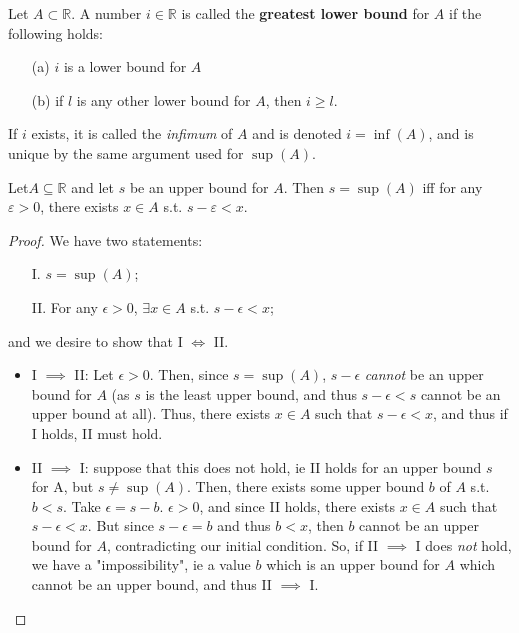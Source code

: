 \documentclass[12pt]{article}
\begin{document}
\begin{definition}
  Let $A \subset \mathbb{R}$. A number $i \in \mathbb{R}$ is called the \textbf{greatest lower bound} for $A$ if the following holds:
  \begin{itemize}
    \item[(a)] $i$ is a lower bound for $A$
    \item[(b)] if $l$ is any other lower bound for $A$, then $i \geq l$.
  \end{itemize}
  If $i$ exists, it is called the \emph{infimum} of $A$ and is denoted $i = \inf(A)$, and is unique by the same argument used for $\sup(A)$.
\end{definition}

\begin{proposition}\label{prop:supepsilon}
  Let\footnotemark $A \subseteq \mathbb{R}$ and let $s$ be an upper bound for $A$. Then $s = \sup(A)$ iff for any $\varepsilon>0$, there exists $x \in A$ s.t. $s- \varepsilon < x$.
\end{proposition}
\begin{proof}
  We have two statements:
  \begin{enumerate}
    \item[I.] $s = \sup(A)$;
    \item[II.] For any $\epsilon > 0$, $\exists x \in A$  s.t. $s - \epsilon < x$;
  \end{enumerate}
  and we desire to show that I $\iff$ II.
  \begin{itemize}
    \item I $\implies$ II: Let $\epsilon > 0$. Then, since $s = \sup(A)$, $s - \epsilon$ \textit{cannot} be an upper bound for $A$ (as $s$ is the least upper bound, and thus $s - \epsilon < s$ cannot be an upper bound at all). Thus, there exists $x \in A$ such that $s - \epsilon < x$, and thus if I holds, II must hold.
    \item II $\implies$ I: suppose that this does not hold, ie II holds for an upper bound $s$ for A, but $s \ne \sup(A)$. Then, there exists some upper bound $b$ of $A$ s.t. $b < s$. Take $\epsilon = s - b$. $\epsilon > 0$, and since II holds, there exists $x \in A$ such that $s - \epsilon < x$. But since $s - \epsilon = b$ and thus $b<x$, then $b$ cannot be an upper bound for $A$, contradicting our initial condition. So, if II $\implies$ I does \textit{not} hold, we have a "impossibility", ie a value $b$ which is an upper bound for $A$ which cannot be an upper bound, and thus II $\implies$ I.
  \end{itemize}
\end{proof}
\end{document}
